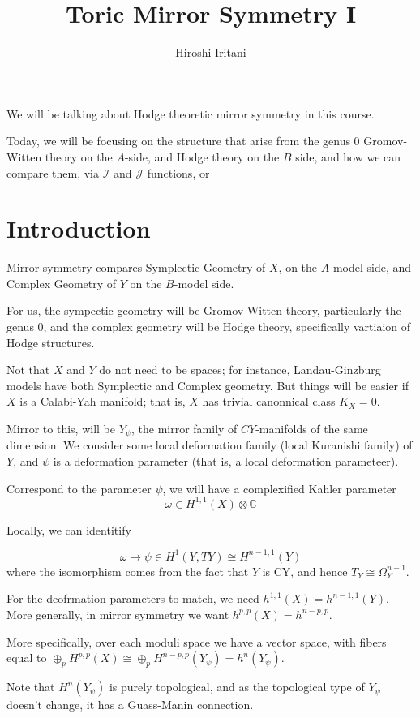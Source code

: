 \documentclass{amsart}
\author{Hiroshi Iritani}
\title{Toric Mirror Symmetry I}
\theoremstyle{definition}
\newcommand{\I}{\mathcal{I}}
\newcommand{\J}{\mathcal{J}}
\newcommand{\C}{\mathbb{C}}
\begin{document}
\maketitle
We will be talking about Hodge theoretic mirror symmetry in this course.

Today, we will be focusing on the structure that arise from the genus 0 Gromov-Witten theory on the $A$-side, and Hodge theory on the $B$ side, and how we can compare them, via $\I$ and $\J$ functions, or 

\section{Introduction}

Mirror symmetry compares Symplectic Geometry of $X$, on the $A$-model side, and Complex Geometry of $Y$ on the $B$-model side.

For us, the sympectic geometry will be Gromov-Witten theory, particularly the genus 0, and the complex geometry will be Hodge theory, specifically vartiaion of Hodge structures.

Not that $X$ and $Y$ do not need to be spaces; for instance, Landau-Ginzburg models have both Symplectic and Complex geometry.  But things will be easier if $X$ is a Calabi-Yah manifold; that is, $X$ has trivial canonnical class $K_X=0$.

Mirror to this, will be $Y_\psi$, the mirror family of $CY$-manifolds of the same dimension.  We consider some local deformation family (local Kuranishi family) of $Y$, and $\psi$ is a deformation parameter (that is, a local deformation parameteer).

Correspond to the parameter $\psi$, we will have a complexified Kahler parameter $$\omega\in H^{1,1}(X)\otimes\C$$

Locally, we can identitify

$$
\omega\mapsto \psi\in H^1(Y, TY)\cong H^{n-1,1}(Y)$$
where the isomorphism comes from the fact that $Y$ is CY, and hence $T_Y\cong \Omega_Y^{n-1}$.

For the deofrmation parameters to match, we need $h^{1,1}(X)=h^{n-1,1}(Y)$.  More generally, in mirror symmetry we want $h^{p,p}(X)=h^{n-p,p}$.

More specifically, over each moduli space we have a vector space, with fibers equal to $\oplus_{p} H^{p,p}(X)\cong \oplus_{p} H^{n-p,p}(Y_\psi)=h^n(Y_\psi)$.

Note that $H^n(Y_\psi)$ is purely topological, and as the topological type of $Y_\psi$ doesn't change, it has a Guass-Manin connection.
\end{document}
